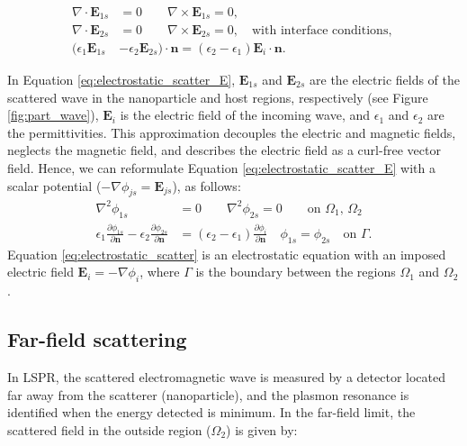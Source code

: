 \begin{align} \label{eq:electrostatic_scatter_E}
\nabla \cdot \mathbf{E}_{1s} &= 0 \qquad \nabla \times \mathbf{E}_{1s} = 0, \nonumber \\
\nabla \cdot \mathbf{E}_{2s} &= 0 \qquad \nabla \times \mathbf{E}_{2s} = 0, \nonumber \quad
\text{with interface conditions, } \nonumber \\
(\epsilon_1\mathbf{E}_{1s} &- \epsilon_2\mathbf{E}_{2s})\cdot\mathbf{n} = (\epsilon_2-\epsilon_1)\mathbf{E}_i\cdot \mathbf{n}.
\end{align}

In Equation \eqref{eq:electrostatic_scatter_E}, $\mathbf{E}_{1s}$ and $\mathbf{E}_{2s}$ 
are the electric fields of the scattered wave in the nanoparticle and host regions, respectively 
(see Figure \ref{fig:part_wave}), $\mathbf{E}_{i}$ is the electric field of the incoming wave, and $\epsilon_1$ 
and $\epsilon_2$ are the permittivities. This approximation decouples the electric and magnetic fields, neglects the magnetic field, 
and describes the electric field as a curl-free vector field. Hence, we can reformulate Equation \eqref{eq:electrostatic_scatter_E} with a scalar potential
($-\nabla \phi_{js} = \mathbf{E}_{js}$), as follows:
%
\begin{align} \label{eq:electrostatic_scatter}
\nabla^2 \phi_{1s} &= 0 \qquad \nabla^2 \phi_{2s} = 0 \qquad\text{on $\Omega_1$, $\Omega_2$} \nonumber \\
\epsilon_1\frac{\partial\phi_{1s}}{\partial \mathbf{n}} - \epsilon_2\frac{\partial\phi_{2s}}{\partial\mathbf{n}} &= (\epsilon_2-\epsilon_1)\frac{\partial\phi_i}{\partial\mathbf{n}} \quad \phi_{1s} = \phi_{2s} \quad \text{on $\Gamma$}.
\end{align}
%
Equation \eqref{eq:electrostatic_scatter} is an electrostatic equation with an imposed electric
field $\mathbf{E}_i=-\nabla\phi_i$, where $\Gamma$ is the boundary between the regions $\Omega_1$ and $\Omega_2$.

\subsection{Far-field scattering} \label{sec:ff_scattering}

In LSPR, the scattered electromagnetic wave is measured by a detector located far away 
from the scatterer (nanoparticle), and the plasmon resonance is identified when the energy 
detected is minimum. In the far-field limit, the scattered field
in the outside region ($\Omega_2$) is given by: 

